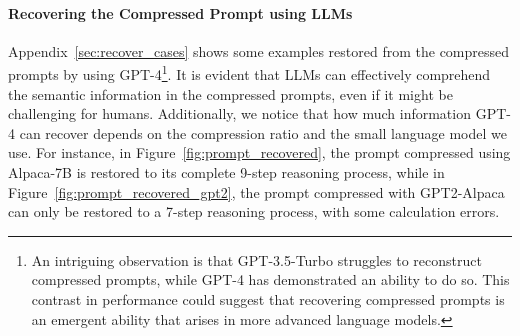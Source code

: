 \paragraph{Recovering the Compressed Prompt using LLMs}
Appendix~\ref{sec:recover_cases} shows some examples restored from the compressed prompts by using GPT-4\footnote{{An intriguing observation is that GPT-3.5-Turbo struggles to reconstruct compressed prompts, while GPT-4 has demonstrated an ability to do so. This contrast in performance could suggest that recovering compressed prompts is an emergent ability that arises in more advanced language models.}}.
It is evident that LLMs can effectively comprehend the semantic information in the compressed prompts, even if it might be challenging for humans.
Additionally, we notice that how much information GPT-4 can recover depends on the compression ratio and the small language model we use.
For instance, in Figure~\ref{fig:prompt_recovered}, the prompt compressed using Alpaca-7B is restored to its complete 9-step reasoning process, while in Figure~\ref{fig:prompt_recovered_gpt2}, the prompt compressed with GPT2-Alpaca can only be restored to a 7-step reasoning process, with some calculation errors.








